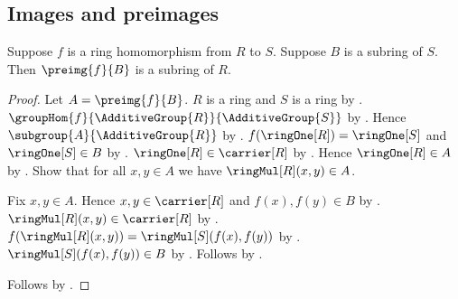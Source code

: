 \subsection{Images and preimages}

\begin{theorem}\label{ring_hom_subring_preimage}
    Suppose $f$ is a ring homomorphism from $R$ to $S$.
    Suppose $B$ is a subring of $S$.
    Then $\preimg{f}{B}$ is a subring of $R$.
\end{theorem}
\begin{proof}
    Let $A=\preimg{f}{B}$.
    $R$ is a ring and $S$ is a ring by
        .
    $\groupHom{f}{\AdditiveGroup{R}}{\AdditiveGroup{S}}$ by
        .
    Hence $\subgroup{A}{\AdditiveGroup{R}}$ by
        .
    $f(\ringOne[R])=\ringOne[S]$ and $\ringOne[S]\in B$ by
        .
    $\ringOne[R]\in\carrier[R]$ by .
    Hence $\ringOne[R]\in A$ by
        .
    Show that for all $x,y\in A$ we have $\ringMul[R](x,y)\in A$.
    \begin{subproof}
        Fix $x,y\in A$.
        Hence $x,y\in\carrier[R]$ and $f(x),f(y)\in B$ by
            .
        $\ringMul[R](x,y)\in\carrier[R]$ by .
        $f(\ringMul[R](x,y))=\ringMul[S](f(x),f(y))$ by
            .
        $\ringMul[S](f(x),f(y))\in B$ by .
        Follows by
            .
    \end{subproof}
    Follows by .
\end{proof}

